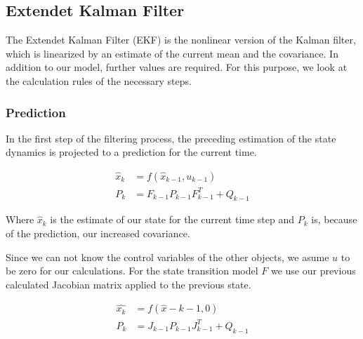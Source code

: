 \documentclass[11pt,oneside,openright]{mpreport}
\begin{document}
\subsection{Extendet Kalman Filter}



The Extendet Kalman Filter (EKF) \cite{Ribeiro2004} is the nonlinear version of the Kalman filter, which is linearized by an estimate of the current mean and the covariance.
In addition to our model, further values are required. For this purpose, we look at the calculation rules of the necessary steps.

\subsubsection{Prediction}

In the first step of the filtering process, the preceding estimation of the state dynamics is projected to a prediction for the current time.

\begin{align*}
\hat{x}_{k} &= f(\hat{x}_{k-1},u_{k-1})\\
P_{k}&=F_{k-1} P_{k-1} {F^T_{k-1}} + Q_{k-1}
\end{align*}

Where $\hat{x}_{k}$ is the estimate of our state for the current time step and $P_{k}$ is, because of the prediction, our increased covariance.


Since we can not know the control variables of the other objects, we asume $u$ to be zero for our calculations.
For the state transition model $F$ we use our previous calculated Jacobian matrix applied to the previous state.

\begin{align*}
\hat{x_{k}} &= f(\hat{x}-{k-1},0)\\
P_{k}&=J_{k-1} P_{k-1} {J^T_{k-1}} + Q_{k-1}
\end{align*}
\end{document}
